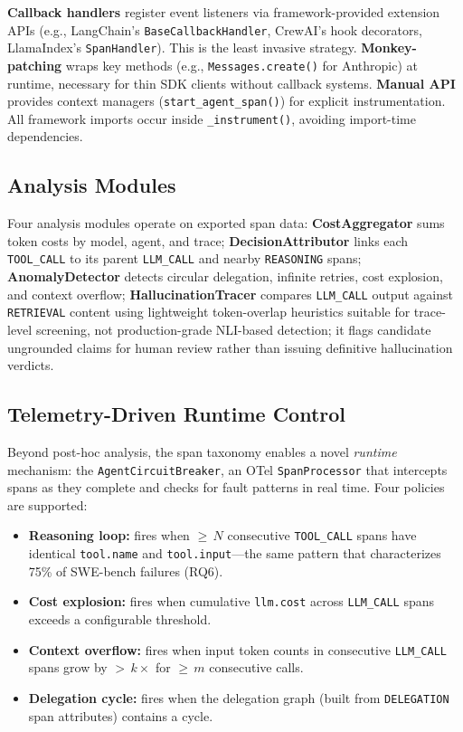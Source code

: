\documentclass[sigplan,10pt,screen]{acmart}
\begin{document}
\textbf{Callback handlers} register event listeners via
framework-provided extension APIs (e.g., LangChain's
\texttt{BaseCallbackHandler}, CrewAI's hook decorators, LlamaIndex's
\texttt{SpanHandler}).  This is the least invasive strategy.
\textbf{Monkey-patching} wraps key methods (e.g.,
\texttt{Messages.create()} for Anthropic) at runtime, necessary for
thin SDK clients without callback systems.  \textbf{Manual API}
provides context managers (\texttt{start\_agent\_span()}) for explicit
instrumentation.  All framework imports occur inside
\texttt{\_instrument()}, avoiding import-time dependencies.

\subsection{Analysis Modules}

Four analysis modules operate on exported span data:
\textbf{CostAggregator} sums token costs by model, agent, and trace;
\textbf{DecisionAttributor} links each \texttt{TOOL\_CALL} to its
parent \texttt{LLM\_CALL} and nearby \texttt{REASONING} spans;
\textbf{AnomalyDetector} detects circular delegation, infinite
retries, cost explosion, and context overflow;
\textbf{HallucinationTracer} compares \texttt{LLM\_CALL} output
against \texttt{RETRIEVAL} content using lightweight token-overlap
heuristics suitable for trace-level screening, not production-grade
NLI-based detection; it flags candidate ungrounded claims for human
review rather than issuing definitive hallucination verdicts.

\subsection{Telemetry-Driven Runtime Control}

Beyond post-hoc analysis, the span taxonomy enables a novel
\emph{runtime} mechanism: the \texttt{AgentCircuitBreaker}, an OTel
\texttt{SpanProcessor} that intercepts spans as they complete and
checks for fault patterns in real time.  Four policies are supported:

\begin{itemize}[nosep]
\item \textbf{Reasoning loop:} fires when $\geq$\,$N$ consecutive
  \texttt{TOOL\_CALL} spans have identical \texttt{tool.name} and
  \texttt{tool.input}---the same pattern that characterizes 75\% of
  SWE-bench failures (RQ6).
\item \textbf{Cost explosion:} fires when cumulative \texttt{llm.cost}
  across \texttt{LLM\_CALL} spans exceeds a configurable threshold.
\item \textbf{Context overflow:} fires when input token counts in
  consecutive \texttt{LLM\_CALL} spans grow by $>$\,$k\times$ for
  $\geq$\,$m$ consecutive calls.
\item \textbf{Delegation cycle:} fires when the delegation graph
  (built from \texttt{DELEGATION} span attributes) contains a cycle.
\end{itemize}
\end{document}
